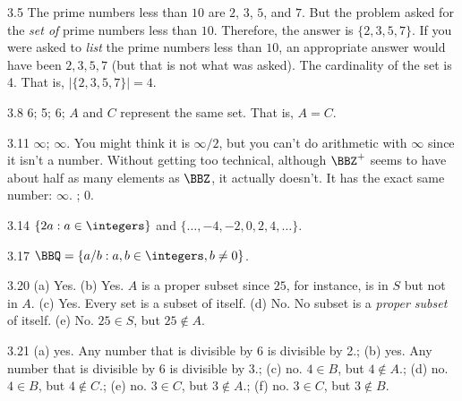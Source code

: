 \begin{Answer}{3.5}
The prime numbers less than $10$ are $2$, $3$, $5$, and $7$.
But the problem asked for the {\em set of} prime numbers less than $10$.
Therefore, the answer is $\{2, 3, 5, 7\}$.
If you were asked to {\em list} the prime numbers less than $10$,
an appropriate answer would have been $2,3,5,7$ (but that is not what was asked).
The cardinality of the set is 4. That is, $|\{2, 3, 5, 7\}|=4$.
\end{Answer}
\begin{Answer}{3.8}
6; 5; 6; $A$ and $C$ represent the same set. That is, $A=C$.
\end{Answer}
\begin{Answer}{3.11}
$\infty$; $\infty$.  You might think it is $\infty/2$, but you can't do arithmetic with $\infty$ since it
isn't a number. Without getting too technical, although $\BBZ^+$ seems to have about half as many elements
as $\BBZ$, it actually doesn't.  It has the exact same number: $\infty$. ; $0$.
\end{Answer}
\begin{Answer}{3.14}
$\{2a : a\in\integers \}$ and $\{\ldots, -4, -2, 0, 2, 4, \ldots\}$.
\end{Answer}
\begin{Answer}{3.17}
$\BBQ = \{a/b : a,b\in\integers,b\neq 0 \}$.
\end{Answer}
\begin{Answer}{3.20}
(a) Yes.
(b) Yes.  $A$ is a proper subset since $25$, for instance, is in $S$ but not in $A$.
(c) Yes.  Every set is a subset of itself.
(d) No.  No subset is a {\em proper subset} of itself.
(e) No.  $25\in S$, but $25\not\in A$.
\end{Answer}
\begin{Answer}{3.21}
(a) yes.  Any number that is divisible by 6 is divisible by 2.;
(b) yes. Any number that is divisible by 6 is divisible by 3.;
(c) no.  $4\in B$, but $4\not\in A$.;
(d) no.  $4\in B$, but $4\not\in C$.;
(e) no.  $3\in C$, but $3\not\in A$.;
(f) no.  $3\in C$, but $3\not\in B$.
\end{Answer}
